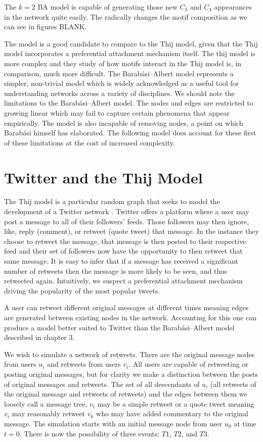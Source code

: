 The $k=2$ BA model is capable of generating those new $C_3$ and $C_4$ appearances in the network 
quite easily. The radically changes the motif composition as we can see in figures BLANK.

The model is a good candidate to compare to the Thij model, given that the Thij model incorporates
a preferential attachment mechanism itself. The thij model is more complex and they study of how motifs interact
in the Thij model is, in comparison, much more difficult. The Barabási–Albert model 
represents a simpler, non-trivial model which is widely acknowledged as a useful tool
for understanding networks across a variety of disciplines. We should note the 
limitations to the Barabási–Albert model. The nodes and edges are restricted to growing linear which
may fail to capture certain phenomena that appear empirically. The model is also incapable
 of removing nodes, a point on which Barabási himself has elaborated. The following model
 does account for these first of these limitations at the cost of increased complexity.

\chapter{Twitter and the Thij Model}
\label{section:Thij model}
The Thij model is a particular random graph that seeks to model the development of a Twitter network 
 \cite{thij}. Twitter offers a platform where a user may post a message
to all of their followers' feeds. Those followers may then ignore, like, reply (comment), or retweet (quote tweet) that message. In the
instance they choose to retweet the message, that message is then posted to their respective feed and their
set of followers now have the opportunity to then retweet that same message. It is easy to infer that if a 
message has received a significant number of retweets 
 then the message is more likely to be seen, and thus
retweeted again. Intuitively, we suspect a preferential attachment mechanism driving the popularity of the most popular tweets.

A user can retweet different original messages at different times meaning edges are generated between
existing nodes in the network. Accounting for this one can produce
a model better suited to Twitter than the Barabási–Albert model described in chapter 3.

We wish to simulate a network of retweets. There are the original message nodes from users $u_i$ and retweets from users $v_i$. All users
are capable of retweeting or posting original messages, but for clarity we make a distinction between the posts of original messages and retweets.
 The set of all descendants of $u_i$ (all retweets of the original message and retweets of retweets) and the edges between them
we loosely call a message tree. $v_i$ may be a simple retweet or a quote tweet meaning $v_i$ may reasonably retweet $v_k$ who may have added commentary to the original message.
 The simulation starts with an initial message node from user $u_{0}$ at time $t=0$. There is now the possibility of three events: $T1$,
$T2$, and $T3$.


